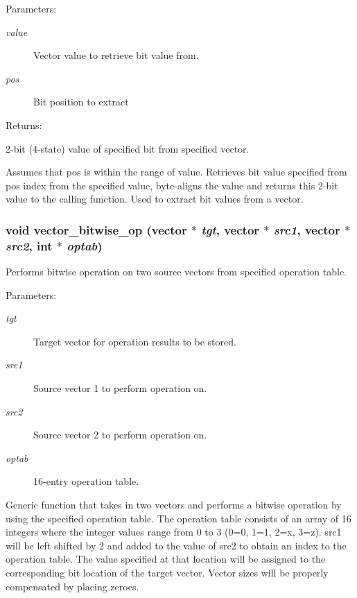 \begin{Desc}
\item[Parameters: ]\par
\begin{description}
\item[{\em 
value}]Vector value to retrieve bit value from. \item[{\em 
pos}]Bit position to extract \end{description}
\end{Desc}
\begin{Desc}
\item[Returns: ]\par
2-bit (4-state) value of specified bit from specified vector.\end{Desc}
Assumes that pos is within the range of value. Retrieves bit value specified from pos index from the specified value, byte-aligns the value and returns this 2-bit value to the calling function. Used to extract bit values from a vector. 
\subsubsection{\setlength{\rightskip}{0pt plus 5cm}void vector\_\-bitwise\_\-op ({\bf vector} $\ast$ {\em tgt}, {\bf vector} $\ast$ {\em src1}, {\bf vector} $\ast$ {\em src2}, int $\ast$ {\em optab})}\label{vector_8c_a33}


Performs bitwise operation on two source vectors from specified operation table.

\begin{Desc}
\item[Parameters: ]\par
\begin{description}
\item[{\em 
tgt}]Target vector for operation results to be stored. \item[{\em 
src1}]Source vector 1 to perform operation on. \item[{\em 
src2}]Source vector 2 to perform operation on. \item[{\em 
optab}]16-entry operation table.\end{description}
\end{Desc}
Generic function that takes in two vectors and performs a bitwise operation by using the specified operation table. The operation table consists of an array of 16 integers where the integer values range from 0 to 3 (0=0, 1=1, 2=x, 3=z). src1 will be left shifted by 2 and added to the value of src2 to obtain an index to the operation table. The value specified at that location will be assigned to the corresponding bit location of the target vector. Vector sizes will be properly compensated by placing zeroes. 

